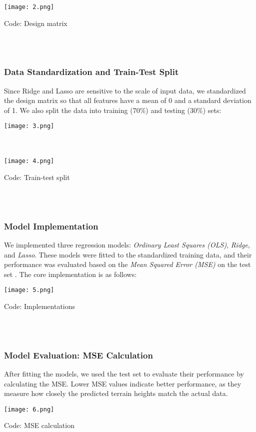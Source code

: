 \documentclass{article}
\begin{document}
\begin{enumerate}
\texttt{[image: 2.png]}
\caption{Code: Design matrix }
\label{fig:enter-label}\\\\


\subsubsection{Data Standardization and Train-Test Split}

Since Ridge and Lasso are sensitive to the scale of input data, we standardized the design matrix so that all features have a mean of 0 and a standard deviation of 1. We also split the data into training (70\%) and testing (30\%) sets:


\texttt{[image: 3.png]}
\caption{}
\label{fig:enter-label}\\\\
\texttt{[image: 4.png]}
\caption{Code: Train-test split }
\label{fig:enter-label}\\\\


\subsubsection{Model Implementation}

We implemented three regression models: \textit{Ordinary Least Squares (OLS)}, \textit{Ridge}, and \textit{Lasso}. These models were fitted to the standardized training data, and their performance was evaluated based on the \textit{Mean Squared Error (MSE)} on the test set \cite{james2013introduction}. The core implementation is as follows:


\texttt{[image: 5.png]}
\caption{Code: Implementations }
\label{fig:enter-label}\\\\



\subsubsection{Model Evaluation: MSE Calculation}

After fitting the models, we used the test set to evaluate their performance by calculating the MSE. Lower MSE values indicate better performance, as they measure how closely the predicted terrain heights match the actual data.

\texttt{[image: 6.png]}
\caption{Code: MSE calculation }
\label{fig:enter-label}\\\\



\end{enumerate}
\end{document}
